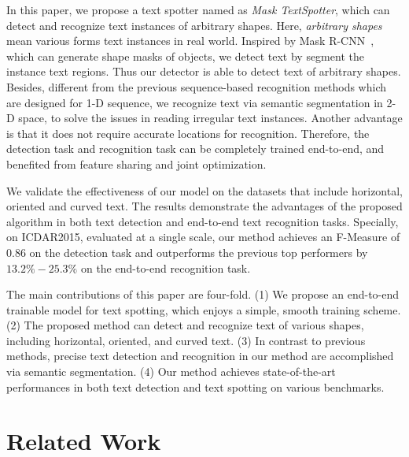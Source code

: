 \documentclass[runningheads]{llncs}
\begin{document}
In this paper, we propose a text spotter named as \emph{Mask TextSpotter}, which can detect and recognize text instances of arbitrary shapes. Here, \textit{arbitrary shapes} mean various forms text instances in real world. Inspired by Mask R-CNN~\cite{he2017mask}, which can generate shape masks of objects, we detect text by segment the instance text regions. Thus our detector is able to detect text of arbitrary shapes. Besides, different from the previous sequence-based recognition methods \cite{shi2016robust,shi2017end,lee2016recursive} which are designed for 1-D sequence, we recognize text via semantic segmentation in 2-D space, to solve the issues in reading irregular text instances. Another advantage is that it does not require accurate locations for recognition. Therefore, the detection task and recognition task can be completely trained end-to-end, and benefited from feature sharing and joint optimization.

We validate the effectiveness of our model on the datasets that include horizontal, oriented and curved text. The results demonstrate the advantages of the proposed algorithm in both text detection and end-to-end text recognition tasks. Specially, on ICDAR2015, evaluated at a single scale, our method achieves an F-Measure of 0.86 on the detection task and outperforms the previous top performers by $13.2\%-25.3\%$ on the end-to-end recognition task.

The main contributions of this paper are four-fold. (1) We propose an end-to-end trainable model for text spotting, which enjoys a simple, smooth training scheme. (2) The proposed method can detect and recognize text of various shapes, including horizontal, oriented, and curved text. (3) In contrast to previous methods, precise text detection and recognition in our method are accomplished via semantic segmentation. (4) Our method achieves state-of-the-art performances in both text detection and text spotting on various benchmarks.

\section{Related Work}
\end{document}
